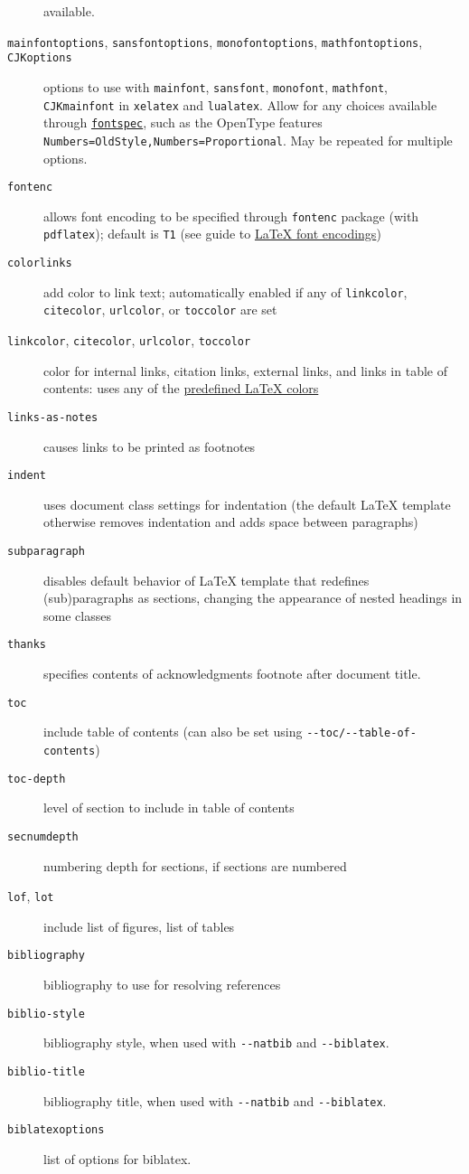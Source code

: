 \documentclass[]{article}
\begin{document}
\begin{description}
available.
\item[\texttt{mainfontoptions}, \texttt{sansfontoptions},
\texttt{monofontoptions}, \texttt{mathfontoptions}, \texttt{CJKoptions}]
options to use with \texttt{mainfont}, \texttt{sansfont},
\texttt{monofont}, \texttt{mathfont}, \texttt{CJKmainfont} in
\texttt{xelatex} and \texttt{lualatex}. Allow for any choices available
through \href{https://ctan.org/pkg/fontspec}{\texttt{fontspec}}, such as
the OpenType features \texttt{Numbers=OldStyle,Numbers=Proportional}.
May be repeated for multiple options.
\item[\texttt{fontenc}]
allows font encoding to be specified through \texttt{fontenc} package
(with \texttt{pdflatex}); default is \texttt{T1} (see guide to
\href{https://ctan.org/pkg/encguide}{LaTeX font encodings})
\item[\texttt{colorlinks}]
add color to link text; automatically enabled if any of
\texttt{linkcolor}, \texttt{citecolor}, \texttt{urlcolor}, or
\texttt{toccolor} are set
\item[\texttt{linkcolor}, \texttt{citecolor}, \texttt{urlcolor},
\texttt{toccolor}]
color for internal links, citation links, external links, and links in
table of contents: uses any of the
\href{https://en.wikibooks.org/wiki/LaTeX/Colors\#Predefined_colors}{predefined
LaTeX colors}
\item[\texttt{links-as-notes}]
causes links to be printed as footnotes
\item[\texttt{indent}]
uses document class settings for indentation (the default LaTeX template
otherwise removes indentation and adds space between paragraphs)
\item[\texttt{subparagraph}]
disables default behavior of LaTeX template that redefines
(sub)paragraphs as sections, changing the appearance of nested headings
in some classes
\item[\texttt{thanks}]
specifies contents of acknowledgments footnote after document title.
\item[\texttt{toc}]
include table of contents (can also be set using
\texttt{-\/-toc/-\/-table-of-contents})
\item[\texttt{toc-depth}]
level of section to include in table of contents
\item[\texttt{secnumdepth}]
numbering depth for sections, if sections are numbered
\item[\texttt{lof}, \texttt{lot}]
include list of figures, list of tables
\item[\texttt{bibliography}]
bibliography to use for resolving references
\item[\texttt{biblio-style}]
bibliography style, when used with \texttt{-\/-natbib} and
\texttt{-\/-biblatex}.
\item[\texttt{biblio-title}]
bibliography title, when used with \texttt{-\/-natbib} and
\texttt{-\/-biblatex}.
\item[\texttt{biblatexoptions}]
list of options for biblatex.
\end{description}
\end{document}
